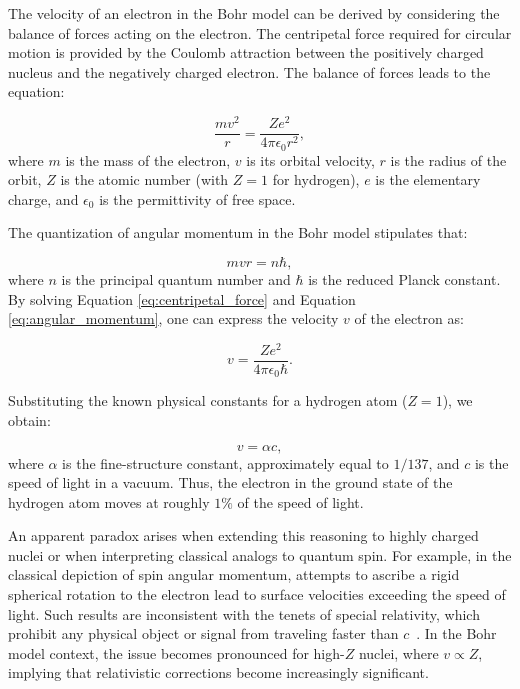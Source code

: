 \documentclass[%
 reprint,
 amsmath,amssymb,
 aps,
]{revtex4-1}
\numberwithin{equation}{section}%
\begin{document}
The velocity of an electron in the Bohr model can be derived by considering the balance of forces acting on the electron. The centripetal force required for circular motion is provided by the Coulomb attraction between the positively charged nucleus and the negatively charged electron. The balance of forces leads to the equation:

\begin{equation}
\frac{m v^2}{r} = \frac{Z e^2}{4 \pi \epsilon_0 r^2},
\label{eq:centripetal_force}
\end{equation}
where \( m \) is the mass of the electron, \( v \) is its orbital velocity, \( r \) is the radius of the orbit, \( Z \) is the atomic number (with \( Z = 1 \) for hydrogen), \( e \) is the elementary charge, and \( \epsilon_0 \) is the permittivity of free space.

The quantization of angular momentum in the Bohr model stipulates that:

\begin{equation}
m v r = n \hbar,
\label{eq:angular_momentum}
\end{equation}
where \( n \) is the principal quantum number and \( \hbar \) is the reduced Planck constant. By solving Equation \ref{eq:centripetal_force} and Equation \ref{eq:angular_momentum}, one can express the velocity \( v \) of the electron as:

\begin{equation}
v = \frac{Z e^2}{4 \pi \epsilon_0 \hbar}.
\label{eq:bohr_velocity}
\end{equation}

Substituting the known physical constants for a hydrogen atom (\( Z = 1 \)), we obtain:

\begin{equation}
v = \alpha c,
\label{eq:bohr_velocity_alpha}
\end{equation}
where \( \alpha \) is the fine-structure constant, approximately equal to \( 1/137 \), and \( c \) is the speed of light in a vacuum. Thus, the electron in the ground state of the hydrogen atom moves at roughly \( 1\% \) of the speed of light.

An apparent paradox arises when extending this reasoning to highly charged nuclei or when interpreting classical analogs to quantum spin. For example, in the classical depiction of spin angular momentum, attempts to ascribe a rigid spherical rotation to the electron lead to surface velocities exceeding the speed of light. Such results are inconsistent with the tenets of special relativity, which prohibit any physical object or signal from traveling faster than \( c \)~\cite{Einstein1905}. In the Bohr model context, the issue becomes pronounced for high-\( Z \) nuclei, where \( v \propto Z \), implying that relativistic corrections become increasingly significant.
\end{document}
